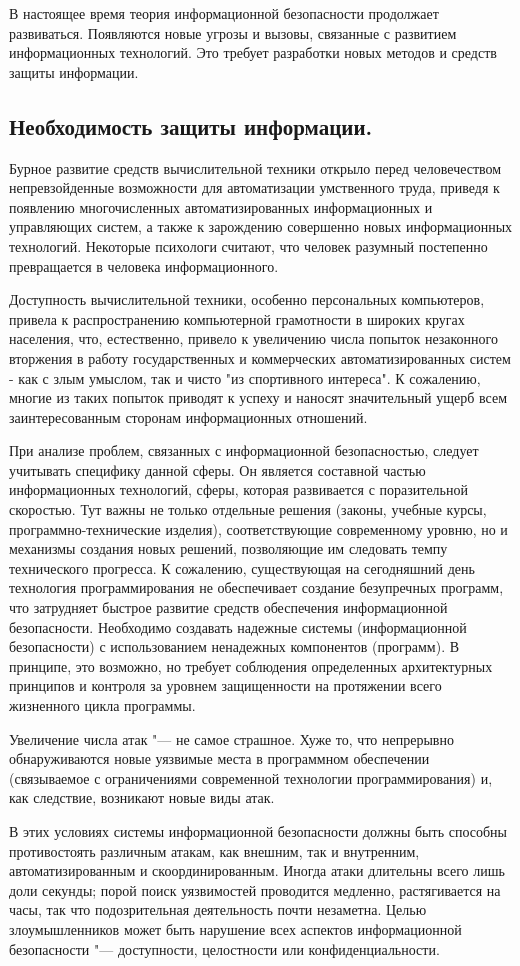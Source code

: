 В настоящее время теория информационной безопасности продолжает развиваться. Появляются новые угрозы и вызовы, связанные с 
развитием информационных технологий. Это требует разработки новых методов и средств защиты информации.\cite{urfu}

\newpage
\subsection{Необходимость защиты информации.}
Бурное развитие средств вычислительной техники открыло перед человечеством непревзойденные возможности для автоматизации 
умственного труда, приведя к появлению многочисленных автоматизированных информационных и управляющих систем, а также к 
зарождению совершенно новых информационных технологий. Некоторые психологи считают, что человек разумный постепенно 
превращается в человека информационного.

Доступность вычислительной техники, особенно персональных компьютеров, привела к распространению компьютерной грамотности в 
широких кругах населения, что, естественно, привело к увеличению числа попыток незаконного вторжения в работу государственных 
и коммерческих автоматизированных систем - как с злым умыслом, так и чисто "из спортивного интереса". К сожалению, многие из 
таких попыток приводят к успеху и наносят значительный ущерб всем заинтересованным сторонам информационных отношений.

При анализе проблем, связанных с информационной безопасностью, следует учитывать специфику данной сферы. Он 
является составной частью информационных технологий, сферы, которая развивается с поразительной скоростью. Тут важны не 
только отдельные решения (законы, учебные курсы, программно-технические изделия), соответствующие современному уровню, но и 
механизмы создания новых решений, позволяющие им следовать темпу технического прогресса. К сожалению, существующая на 
сегодняшний день технология программирования не обеспечивает создание безупречных программ, что затрудняет быстрое развитие 
средств обеспечения информационной безопасности. Необходимо создавать надежные системы (информационной безопасности) с 
использованием ненадежных компонентов (программ). В принципе, это возможно, но требует соблюдения определенных архитектурных 
принципов и контроля за уровнем защищенности на протяжении всего жизненного цикла программы.

Увеличение числа атак "--- не самое страшное. Хуже то, что непрерывно обнаруживаются новые уязвимые места в программном 
обеспечении (связываемое с ограничениями современной технологии программирования) и, как следствие, возникают новые виды атак.

В этих условиях системы информационной безопасности должны быть способны противостоять различным атакам, как внешним, так и 
внутренним, автоматизированным и скоординированным. Иногда атаки длительны всего лишь доли секунды; порой поиск уязвимостей 
проводится медленно, растягивается на часы, так что подозрительная деятельность почти незаметна. Целью злоумышленников может 
быть нарушение всех аспектов информационной безопасности "---  доступности, целостности или конфиденциальности.\cite{biblio}

